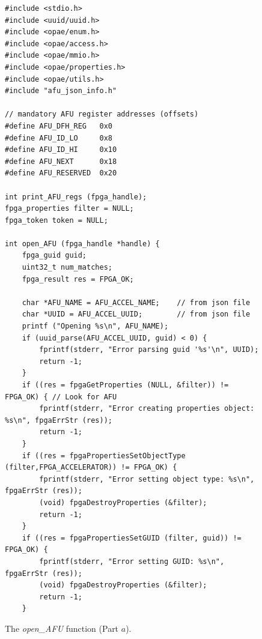 \documentclass[11pt, twoside, pdftex]{article}
\begin{document}
\vspace{-0.5cm}
\lstset{language=C,numbers=none,escapechar=|}
\begin{figure}[h]
\begin{center}
\begin{minipage}[h]{\textwidth}
\begin{lstlisting}[name=manage]
#include <stdio.h>
#include <uuid/uuid.h>
#include <opae/enum.h>
#include <opae/access.h>
#include <opae/mmio.h>
#include <opae/properties.h>
#include <opae/utils.h>
#include "afu_json_info.h"

// mandatory AFU register addresses (offsets)
#define AFU_DFH_REG   0x0
#define AFU_ID_LO     0x8 
#define AFU_ID_HI     0x10
#define AFU_NEXT      0x18
#define AFU_RESERVED  0x20

int print_AFU_regs (fpga_handle);
fpga_properties filter = NULL;
fpga_token token = NULL;

int open_AFU (fpga_handle *handle) {
    fpga_guid guid;
    uint32_t num_matches;
    fpga_result res = FPGA_OK;

    char *AFU_NAME = AFU_ACCEL_NAME;    // from json file
    char *UUID = AFU_ACCEL_UUID;        // from json file
    printf ("Opening %s\n", AFU_NAME);
    if (uuid_parse(AFU_ACCEL_UUID, guid) < 0) {
        fprintf(stderr, "Error parsing guid '%s'\n", UUID);
        return -1;
    }
    if ((res = fpgaGetProperties (NULL, &filter)) != FPGA_OK) { // Look for AFU 
        fprintf(stderr, "Error creating properties object: %s\n", fpgaErrStr (res));
        return -1;
    }
    if ((res = fpgaPropertiesSetObjectType (filter,FPGA_ACCELERATOR)) != FPGA_OK) {
        fprintf(stderr, "Error setting object type: %s\n", fpgaErrStr (res));
        (void) fpgaDestroyProperties (&filter);
        return -1;
    }
    if ((res = fpgaPropertiesSetGUID (filter, guid)) != FPGA_OK) {
        fprintf(stderr, "Error setting GUID: %s\n", fpgaErrStr (res));
        (void) fpgaDestroyProperties (&filter);
        return -1;
    }
\end{lstlisting}
\end{minipage}
\caption{The {\it open\_AFU} function (Part $a$).}
\label{fig:open_AFU}
\end{center}
\end{figure}
\end{document}
